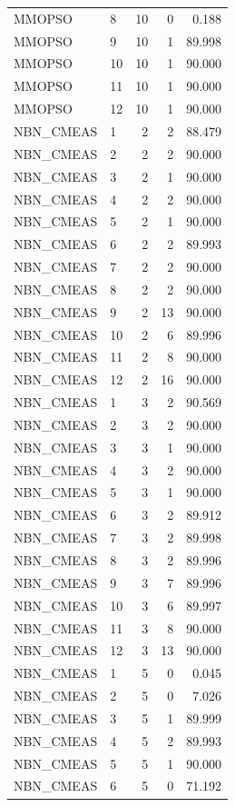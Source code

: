 \begin{longtable}{llrrr}
MMOPSO & 8 & 10 & 0 & 0.188 \\
MMOPSO & 9 & 10 & 1 & 89.998 \\
MMOPSO & 10 & 10 & 1 & 90.000 \\
MMOPSO & 11 & 10 & 1 & 90.000 \\
MMOPSO & 12 & 10 & 1 & 90.000 \\
NBN\_CMEAS & 1 & 2 & 2 & 88.479 \\
NBN\_CMEAS & 2 & 2 & 2 & 90.000 \\
NBN\_CMEAS & 3 & 2 & 1 & 90.000 \\
NBN\_CMEAS & 4 & 2 & 2 & 90.000 \\
NBN\_CMEAS & 5 & 2 & 1 & 90.000 \\
NBN\_CMEAS & 6 & 2 & 2 & 89.993 \\
NBN\_CMEAS & 7 & 2 & 2 & 90.000 \\
NBN\_CMEAS & 8 & 2 & 2 & 90.000 \\
NBN\_CMEAS & 9 & 2 & 13 & 90.000 \\
NBN\_CMEAS & 10 & 2 & 6 & 89.996 \\
NBN\_CMEAS & 11 & 2 & 8 & 90.000 \\
NBN\_CMEAS & 12 & 2 & 16 & 90.000 \\
NBN\_CMEAS & 1 & 3 & 2 & 90.569 \\
NBN\_CMEAS & 2 & 3 & 2 & 90.000 \\
NBN\_CMEAS & 3 & 3 & 1 & 90.000 \\
NBN\_CMEAS & 4 & 3 & 2 & 90.000 \\
NBN\_CMEAS & 5 & 3 & 1 & 90.000 \\
NBN\_CMEAS & 6 & 3 & 2 & 89.912 \\
NBN\_CMEAS & 7 & 3 & 2 & 89.998 \\
NBN\_CMEAS & 8 & 3 & 2 & 89.996 \\
NBN\_CMEAS & 9 & 3 & 7 & 89.996 \\
NBN\_CMEAS & 10 & 3 & 6 & 89.997 \\
NBN\_CMEAS & 11 & 3 & 8 & 90.000 \\
NBN\_CMEAS & 12 & 3 & 13 & 90.000 \\
NBN\_CMEAS & 1 & 5 & 0 & 0.045 \\
NBN\_CMEAS & 2 & 5 & 0 & 7.026 \\
NBN\_CMEAS & 3 & 5 & 1 & 89.999 \\
NBN\_CMEAS & 4 & 5 & 2 & 89.993 \\
NBN\_CMEAS & 5 & 5 & 1 & 90.000 \\
NBN\_CMEAS & 6 & 5 & 0 & 71.192 \\

\end{longtable}
